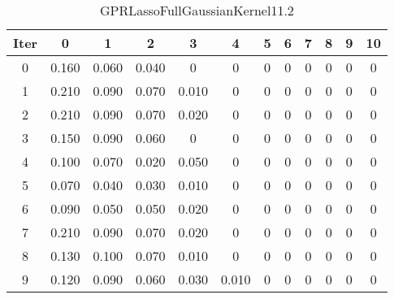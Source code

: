 \begin{table}
	\begin{center}
		\begin{tabular}{|c|c|c|c|c|c|c|c|c|c|c|c|}
			\hline
			Iter & 0 & 1 & 2 & 3 & 4 & 5 & 6 & 7 & 8 & 9 & 10 \\
			\hline
			0 & 0.160 & 0.060 & 0.040 & 0 & 0 & 0 & 0 & 0 & 0 & 0 & 0 \\
			\hline
			1 & 0.210 & 0.090 & 0.070 & 0.010 & 0 & 0 & 0 & 0 & 0 & 0 & 0 \\
			\hline
			2 & 0.210 & 0.090 & 0.070 & 0.020 & 0 & 0 & 0 & 0 & 0 & 0 & 0 \\
			\hline
			3 & 0.150 & 0.090 & 0.060 & 0 & 0 & 0 & 0 & 0 & 0 & 0 & 0 \\
			\hline
			4 & 0.100 & 0.070 & 0.020 & 0.050 & 0 & 0 & 0 & 0 & 0 & 0 & 0 \\
			\hline
			5 & 0.070 & 0.040 & 0.030 & 0.010 & 0 & 0 & 0 & 0 & 0 & 0 & 0 \\
			\hline
			6 & 0.090 & 0.050 & 0.050 & 0.020 & 0 & 0 & 0 & 0 & 0 & 0 & 0 \\
			\hline
			7 & 0.210 & 0.090 & 0.070 & 0.020 & 0 & 0 & 0 & 0 & 0 & 0 & 0 \\
			\hline
			8 & 0.130 & 0.100 & 0.070 & 0.010 & 0 & 0 & 0 & 0 & 0 & 0 & 0 \\
			\hline
			9 & 0.120 & 0.090 & 0.060 & 0.030 & 0.010 & 0 & 0 & 0 & 0 & 0 & 0 \\
			\hline
		\end{tabular}
	\end{center}
	\caption{GPRLassoFullGaussianKernel11.2}
\end{table}
